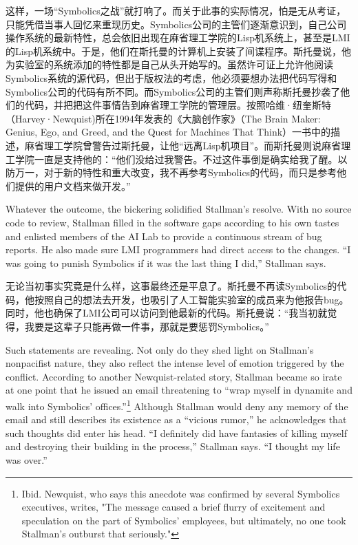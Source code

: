 \ifdefined\chs
这样，一场``Symbolics之战''就打响了。而关于此事的实际情况，怕是无从考证，只能凭借当事人回忆来重现历史。Symbolics公司的主管们逐渐意识到，自己公司操作系统的最新特性，总会依旧出现在麻省理工学院的Lisp机系统上，甚至是LMI的Lisp机系统中。于是，他们在斯托曼的计算机上安装了间谍程序。斯托曼说，他为实验室的系统添加的特性都是自己从头开始写的。虽然许可证上允许他阅读Symbolics系统的源代码，但出于版权法的考虑，他必须要想办法把代码写得和Symbolics公司的代码有所不同。而Symbolics公司的主管们则声称斯托曼抄袭了他们的代码，并把把这件事情告到麻省理工学院的管理层。按照哈维·纽奎斯特（Harvey·Newquist)所在1994年发表的《大脑创作家》（The Brain Maker: Genius, Ego, and Greed, and the Quest for Machines That Think）一书中的描述，麻省理工学院曾警告过斯托曼，让他``远离Lisp机项目''。而斯托曼则说麻省理工学院一直是支持他的：``他们没给过我警告。不过这件事倒是确实给我了醒。以防万一，对于新的特性和重大改变，我不再参考Symbolics的代码，而只是参考他们提供的用户文档来做开发。''
\fi

\ifdefined\eng
Whatever the outcome, the bickering solidified Stallman's resolve. With no source code to review, Stallman filled in the software gaps according to his own tastes and enlisted members of the AI Lab to provide a continuous stream of bug reports. He also made sure LMI programmers had direct access to the changes. ``I was going to punish Symbolics if it was the last thing I did,'' Stallman says.
\fi

\ifdefined\chs
无论当初事实究竟是什么样，这事最终还是平息了。斯托曼不再读Symbolics的代码，他按照自己的想法去开发，也吸引了人工智能实验室的成员来为他报告bug。同时，他也确保了LMI公司可以访问到他最新的代码。斯托曼说：``我当初就觉得，我要是这辈子只能再做一件事，那就是要惩罚Symbolics。''
\fi

\ifdefined\eng
Such statements are revealing. Not only do they shed light on Stallman's nonpacifist nature, they also reflect the intense level of emotion triggered by the conflict. According to another Newquist-related story, Stallman became so irate at one point that he issued an email threatening to ``wrap myself in dynamite and walk into Symbolics' offices.''\footnote{Ibid. Newquist, who says this anecdote was confirmed by several Symbolics executives, writes, "The message caused a brief flurry of excitement and speculation on the part of Symbolics' employees, but ultimately, no one took Stallman's outburst that seriously." } Although Stallman would deny any memory of the email and still describes its existence as a ``vicious rumor,'' he acknowledges that such thoughts did enter his head. ``I definitely did have fantasies of killing myself and destroying their building in the process,'' Stallman says. ``I thought my life was over.''
\fi

